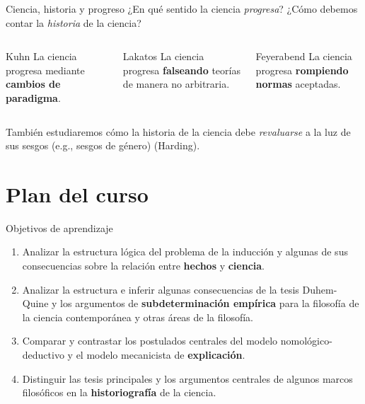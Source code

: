\documentclass[%
            9pt,
                spanish, %
                    ignorenonframetext,
                    handout, %
                aspectratio=169, %
        ]{beamer}
\providecommand{\tightlist}{}
\begin{document}
\begin{frame}{Ciencia, historia y progreso}
\protect{}\label{ciencia-historia-y-progreso}
¿En qué sentido la ciencia \emph{progresa}? ¿Cómo debemos contar la
\emph{historia} de la ciencia? \vspace{-1em}

\begin{columns}[T,onlytextwidth]
\begin{column}{0.3\linewidth}
\begin{block}{Kuhn}
\protect{}\label{kuhn}
La ciencia progresa mediante \textbf{cambios de paradigma}.
\end{block}
\end{column}

\begin{column}{0.3\linewidth}
\begin{block}{Lakatos}
\protect{}\label{lakatos}
La ciencia progresa \textbf{falseando} teorías de manera no arbitraria.
\end{block}
\end{column}

\begin{column}{0.3\linewidth}
\begin{block}{Feyerabend}
\protect{}\label{feyerabend}
La ciencia progresa \textbf{rompiendo normas} aceptadas.
\end{block}
\end{column}
\end{columns}

\vspace{1em}

También estudiaremos cómo la historia de la ciencia debe
\emph{revaluarse} a la luz de sus sesgos (e.g., sesgos de género)
(Harding).
\end{frame}

\section{Plan del curso}\label{plan-del-curso}

\begin{frame}{Objetivos de aprendizaje}
\protect{}\label{objetivos-de-aprendizaje}
\begin{enumerate}
\tightlist
\item
  Analizar la estructura lógica del problema de la inducción y algunas
  de sus consecuencias sobre la relación entre \textbf{hechos} y
  \textbf{ciencia}.
\item
  Analizar la estructura e inferir algunas consecuencias de la tesis
  Duhem-Quine y los argumentos de \textbf{subdeterminación empírica}
  para la filosofía de la ciencia contemporánea y otras áreas de la
  filosofía.
\item
  Comparar y contrastar los postulados centrales del modelo
  nomológico-deductivo y el modelo mecanicista de \textbf{explicación}.
\item
  Distinguir las tesis principales y los argumentos centrales de algunos
  marcos filosóficos en la \textbf{historiografía} de la ciencia.
\end{enumerate}
\end{frame}
\end{document}
